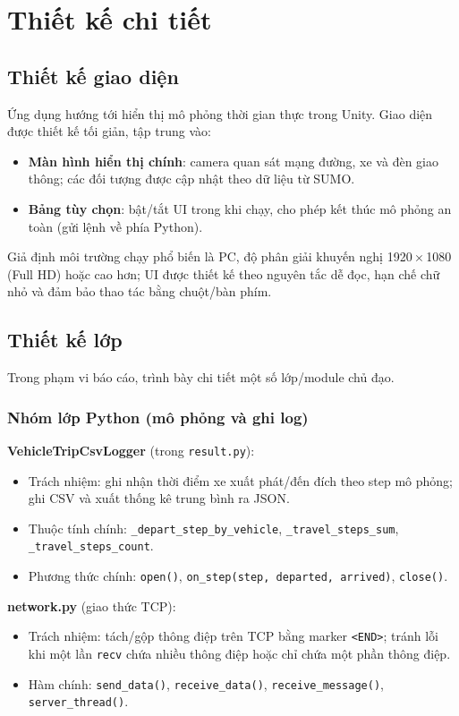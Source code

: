 \documentclass[../DoAn.tex]{subfiles}
\begin{document}
\section{Thiết kế chi tiết}
\subsection{Thiết kế giao diện}
Ứng dụng hướng tới hiển thị mô phỏng thời gian thực trong Unity. Giao diện được thiết kế tối giản, tập trung vào:
\begin{itemize}
	\item \textbf{Màn hình hiển thị chính}: camera quan sát mạng đường, xe và đèn giao thông; các đối tượng được cập nhật theo dữ liệu từ SUMO.
	\item \textbf{Bảng tùy chọn}: bật/tắt UI trong khi chạy, cho phép kết thúc mô phỏng an toàn (gửi lệnh về phía Python).
\end{itemize}
Giả định môi trường chạy phổ biến là PC, độ phân giải khuyến nghị 1920\,$\times$\,1080 (Full HD) hoặc cao hơn; UI được thiết kế theo nguyên tắc dễ đọc, hạn chế chữ nhỏ và đảm bảo thao tác bằng chuột/bàn phím.

\subsection{Thiết kế lớp}
Trong phạm vi báo cáo, trình bày chi tiết một số lớp/module chủ đạo.

\subsubsection*{Nhóm lớp Python (mô phỏng và ghi log)}
\textbf{VehicleTripCsvLogger} (trong \texttt{result.py}):
\begin{itemize}
	\item Trách nhiệm: ghi nhận thời điểm xe xuất phát/đến đích theo step mô phỏng; ghi CSV và xuất thống kê trung bình ra JSON.
	\item Thuộc tính chính: \texttt{\_depart\_step\_by\_vehicle}, \texttt{\_travel\_steps\_sum}, \texttt{\_travel\_steps\_count}.
	\item Phương thức chính: \texttt{open()}, \texttt{on\_step(step, departed, arrived)}, \texttt{close()}.
\end{itemize}

\textbf{network.py} (giao thức TCP):
\begin{itemize}
	\item Trách nhiệm: tách/gộp thông điệp trên TCP bằng marker \texttt{<END>}; tránh lỗi khi một lần \texttt{recv} chứa nhiều thông điệp hoặc chỉ chứa một phần thông điệp.
	\item Hàm chính: \texttt{send\_data()}, \texttt{receive\_data()}, \texttt{receive\_message()}, \texttt{server\_thread()}.
\end{itemize}
\end{document}
